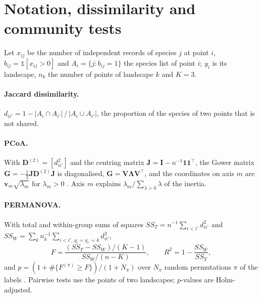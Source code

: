 \documentclass[10pt,a4paper,twocolumn]{article}
\begin{document}
\onecolumn          %
\appendix
\renewcommand{\thesection}{\Alph{section}}

\section{Notation, dissimilarity and community tests}\label{app:community}
Let $x_{ij}$ be the number of independent records of species $j$ at point $i$, $b_{ij}=\mathbb{1}[x_{ij}>0]$
and $A_i=\{j: b_{ij}=1\}$ the species list of point $i$; $y_i$ is its landscape, $n_k$ the number of
points of landscape $k$ and $K=3$.

\paragraph{Jaccard dissimilarity.} $d_{ii'} = 1 - |A_i\cap A_{i'}|\,/\,|A_i\cup A_{i'}|$, the
proportion of the species of two points that is not shared.

\paragraph{PCoA.} With $\mathbf{D}^{(2)}=[d_{ii'}^2]$ and the centring matrix
$\mathbf{J}=\mathbf{I}-n^{-1}\mathbf{1}\mathbf{1}^\top$, the Gower matrix
$\mathbf{G}=-\tfrac12\mathbf{J}\mathbf{D}^{(2)}\mathbf{J}$ is diagonalised,
$\mathbf{G}=\mathbf{V}\bm{\Lambda}\mathbf{V}^\top$, and the coordinates on axis $m$ are
$\mathbf{v}_m\sqrt{\lambda_m}$ for $\lambda_m>0$ \citep{gower1966}. Axis $m$ explains
$\lambda_m/\sum_{\lambda>0}\lambda$ of the inertia.

\paragraph{PERMANOVA.} With total and within-group sums of squares
$SS_T = n^{-1}\sum_{i<i'} d_{ii'}^2$ and $SS_W=\sum_k n_k^{-1}\sum_{i<i',\,y_i=y_{i'}=k} d_{ii'}^2$,
\[
F=\frac{(SS_T-SS_W)/(K-1)}{SS_W/(n-K)},\qquad R^2 = 1-\frac{SS_W}{SS_T},
\]
and $p=(1+\#\{F^{(\pi)}\ge F\})/(1+N_\pi)$ over $N_\pi$ random permutations $\pi$ of the labels
\citep{anderson2001}. Pairwise tests use the points of two landscapes; $p$-values are Holm-adjusted.
\end{document}
